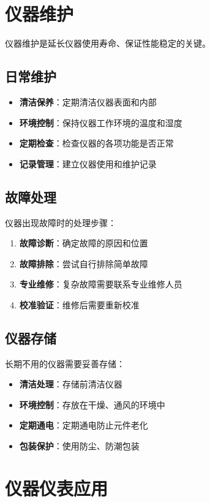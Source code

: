 \section{仪器维护}
\label{sec:instrument_maintenance}

仪器维护是延长仪器使用寿命、保证性能稳定的关键。

\subsection{日常维护}
\begin{itemize}
    \item \textbf{清洁保养}：定期清洁仪器表面和内部
    \item \textbf{环境控制}：保持仪器工作环境的温度和湿度
    \item \textbf{定期检查}：检查仪器的各项功能是否正常
    \item \textbf{记录管理}：建立仪器使用和维护记录
\end{itemize}

\subsection{故障处理}

仪器出现故障时的处理步骤：
\begin{enumerate}
    \item \textbf{故障诊断}：确定故障的原因和位置
    \item \textbf{故障排除}：尝试自行排除简单故障
    \item \textbf{专业维修}：复杂故障需要联系专业维修人员
    \item \textbf{校准验证}：维修后需要重新校准
\end{enumerate}

\subsection{仪器存储}

长期不用的仪器需要妥善存储：
\begin{itemize}
    \item \textbf{清洁处理}：存储前清洁仪器
    \item \textbf{环境控制}：存放在干燥、通风的环境中
    \item \textbf{定期通电}：定期通电防止元件老化
    \item \textbf{包装保护}：使用防尘、防潮包装
\end{itemize}

\section{仪器仪表应用}
\label{sec:instruments_applications}

